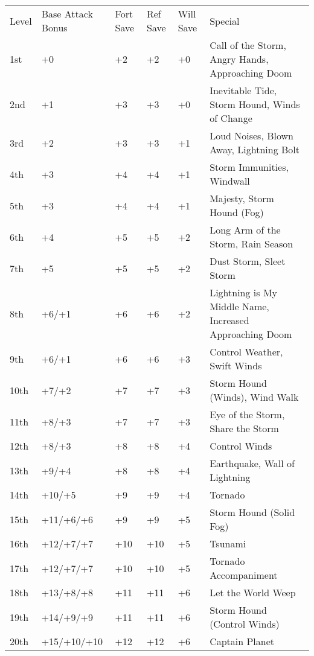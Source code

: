 \begin{table}[tbh]
\begin{small}
\begin{tabular}{lp{2cm}p{0.7cm}p{0.7cm}p{0.7cm}l}
Level  &Base Attack  Bonus &Fort Save &Ref Save &Will Save &Special\\
1st  &+0          &+2 &+2  &+0 & Call of the Storm, Angry Hands, Approaching Doom \\
2nd  &+1          &+3 &+3  &+0 & Inevitable Tide, Storm Hound, Winds of Change \\
3rd  &+2          &+3 &+3  &+1 & Loud Noises, Blown Away, Lightning Bolt \\
4th  &+3          &+4 &+4  &+1 & Storm Immunities, Windwall \\
5th  &+3          &+4 &+4  &+1 & Majesty, Storm Hound (Fog) \\
6th  &+4          &+5 &+5  &+2 & Long Arm of the Storm, Rain Season \\
7th  &+5          &+5 &+5  &+2 & Dust Storm, Sleet Storm \\
8th  &+6/+1       &+6 &+6  &+2 & Lightning is My Middle Name, Increased Approaching Doom \\
9th  &+6/+1       &+6 &+6  &+3 & Control Weather, Swift Winds \\
10th &+7/+2       &+7 &+7  &+3 & Storm Hound (Winds), Wind Walk \\
11th &+8/+3       &+7 &+7  &+3 & Eye of the Storm, Share the Storm \\
12th &+8/+3       &+8 &+8  &+4 & Control Winds \\
13th &+9/+4       &+8 &+8  &+4 & Earthquake, Wall of Lightning \\
14th &+10/+5      &+9 &+9  &+4 & Tornado \\
15th &+11/+6/+6   &+9 &+9  &+5 & Storm Hound (Solid Fog) \\
16th &+12/+7/+7   &+10 &+10 &+5 & Tsunami \\
17th &+12/+7/+7   &+10 &+10 &+5 & Tornado Accompaniment \\
18th &+13/+8/+8   &+11 &+11 &+6 & Let the World Weep \\
19th &+14/+9/+9   &+11 &+11 &+6 & Storm Hound (Control Winds) \\
20th &+15/+10/+10 &+12 &+12 &+6 & Captain Planet \\
\end{tabular}
\end{small}
\end{table}

